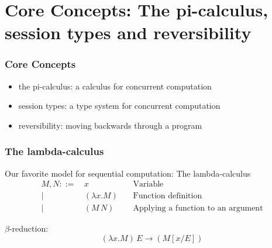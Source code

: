 \documentclass[12pt]{beamer}
\begin{document}
\section{Core Concepts: The pi-calculus, session types and reversibility}


\begin{frame}
\frametitle{Core Concepts}
\begin{center}


\begin{itemize}
    \item the pi-calculus: a calculus for concurrent computation
    \item session types: a type system for concurrent computation
    \item reversibility: moving backwards through a program
\end{itemize}


\end{center}
\end{frame}


\begin{frame}
\frametitle{The lambda-calculus}

Our favorite model for sequential computation: The lambda-calculus 
\begingroup
\fontsize{10pt}{12pt}\selectfont
\begin{align*}
M, N ::= \, & x \,\,\, \, \, & \text{Variable}\\
|\,\,\, & (\lambda x. M) \,\,\, \, \, &\text{Function definition}\\
|\,\,\, & (M\, N) \,\,\, \, \, \, \, \, \, &\text{Applying a function to an argument} 
\end{align*}
\endgroup



$\beta$-reduction: 
$$(\lambda x. M) \, E \rightarrow (M[x/E])$$


\end{frame}
\end{document}
